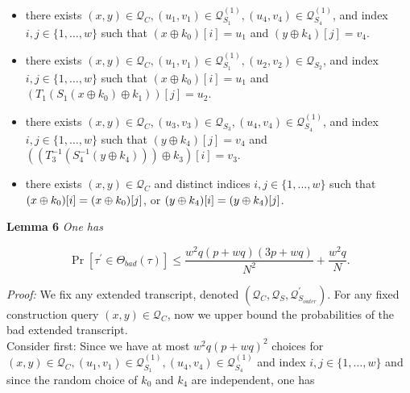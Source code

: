 \begin{itemize}
  \item\bone
  there exists $(x, y) \in \mathcal{Q}_{C}, \left(u_{1}, v_{1}\right) \in \mathcal{Q}_{S_{1}}^{(1)}, \left(u_{4}, v_{4}\right) \in \mathcal{Q}_{S_{4}}^{(1)}$, and index $i, j \in \{1, \ldots, w\}$ such that $\left(x \oplus k_{0}\right)[i]=u_1$ and $\left(y \oplus k_{4}\right)[j]=v_4$.
  \item\btwo
  there exists $(x,y) \in \mathcal{Q}_{C}, \left(u_{1}, v_{1}\right) \in \mathcal{Q}_{S_{1}}^{(1)}, \left(u_{2}, v_{2}\right) \in \mathcal{Q}_{S_{2}}$, and index $i, j \in \{1, \ldots, w\}$ such that $\left(x \oplus k_{0}\right)[i]=u_1$ and $\left(T_{1}\left(S_{1}\left(x \oplus k_{0}\right) \oplus k_{1}\right)\right)[j]=u_2$.
  \item\bthree
  there exists $(x,y) \in \mathcal{Q}_{C}, \left(u_{3}, v_{3}\right) \in \mathcal{Q}_{S_{3}}, \left(u_{4}, v_{4}\right) \in \mathcal{Q}_{S_{4}}^{(1)}$, and index $i, j \in \{1, \ldots, w\}$ such that $\left(y \oplus k_{4}\right)[j]=v_4$ and $\left(\left(T_{3}^{-1}\left(S_{4}^{-1}\left(y \oplus k_{4}\right)\right)\right) \oplus k_{3}\right)[i]=v_3$.
  \item\bfour 
  	there exists $(x,y) \in \mathcal{Q}_{C}$ and distinct indices $i, j \in \{1, \ldots, w\}$ such that $(x\oplus k_0)[i]=(x\oplus k_0)[j]$, or $(y\oplus k_4)[i]=(y\oplus k_4)[j]$.
\end{itemize}

\noindent \textbf{Lemma 6} \emph{One has}

\begin{equation}
\operatorname{Pr}[\tau^{\prime} \in \Theta_{bad}(\tau)] \leq \frac{w^2 q (p+w q) (3 p +w q)}{N^{2}} + \frac{w^{2} q}{N}.
\end{equation}

\noindent \emph{Proof:} We fix any extended transcript, denoted $\left(\mathcal{Q}_{C}, \mathcal{Q}_{S}, \mathcal{Q}_{S_{outer}}^{\prime}\right)$. For any fixed construction query $(x, y) \in \mathcal{Q}_{C}$, now we upper bound the probabilities of the bad extended transcript.\\

\noindent Consider \bone first: Since we have at most $w^{2} q \left(p+w q\right)^{2}$ choices for $(x, y) \in \mathcal{Q}_{C}, \left(u_{1}, v_{1}\right) \in \mathcal{Q}_{S_{1}}^{(1)}, \left(u_{4}, v_{4}\right) \in \mathcal{Q}_{S_{4}}^{(1)}$ and index $i, j \in \{1, \ldots, w\}$ and since the random choice of $k_{0}$ and $k_{4}$ are independent, one has

